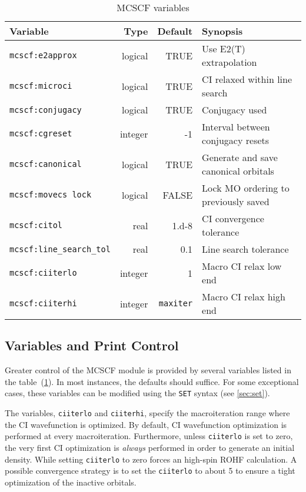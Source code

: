 \begin{table}
\caption{MCSCF variables}
\label{MCSCF_variables}
\vspace{.2in}
\begin{tabular}{lrrl}
\hline\hline
Variable                        & Type     & Default          & Synopsis \\
\hline
\verb+mcscf:e2approx+           & logical  &  TRUE            & Use E2(T) extrapolation \\
\verb+mcscf:microci+            & logical  &  TRUE            & CI relaxed within line search \\
\verb+mcscf:conjugacy+          & logical  &  TRUE            & Conjugacy used \\
\verb+mcscf:cgreset+            & integer  &  -1              & Interval between conjugacy resets \\
\verb+mcscf:canonical+          & logical  &  TRUE            & Generate and save canonical orbitals \\
\verb+mcscf:movecs lock+        & logical  &  FALSE           & Lock MO ordering to previously saved \\
\verb+mcscf:citol+              & real     &  1.d-8           & CI convergence tolerance \\
\verb+mcscf:line_search_tol+    & real     &  0.1             & Line search tolerance  \\
\verb+mcscf:ciiterlo+           & integer  &  1               & Macro CI relax low end \\
\verb+mcscf:ciiterhi+           & integer  &  \verb+maxiter+  & Macro CI relax high end \\
\hline\hline
\end{tabular}
\end{table}

\subsection{Variables and Print Control}
Greater control of the MCSCF module is provided by several variables
listed in the table~(\ref{MCSCF_variables}). In most instances, the
defaults should suffice. For some exceptional cases, these variables can
be modified using the \verb+SET+ syntax (see \ref{sec:set}).

The variables, \verb+ciiterlo+ and \verb+ciiterhi+, specify the
macroiteration range where the CI wavefunction is optimized. By
default, CI wavefunction optimization is performed at every
macroiteration. Furthermore, unless \verb+ciiterlo+ is set to zero,
the very first CI optimization is {\em always} performed in order to
generate an initial density. While setting \verb+ciiterlo+ to zero
forces an high-spin ROHF calculation. A possible convergence strategy
is to set the \verb+ciiterlo+ to about 5 to ensure a tight
optimization of the inactive orbitals.

